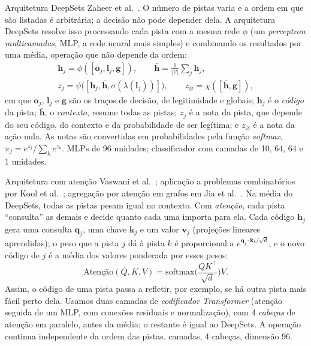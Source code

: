 \begin{metodo}{Arquitetura DeepSets}
\orig Zaheer et al.~\cite{zaheer2017}.
\func O número de pistas varia e a ordem em que são listadas é arbitrária; a decisão não pode depender dela. A
arquitetura DeepSets resolve isso processando cada pista com a mesma rede $\phi$ (um \emph{perceptron multicamadas}, MLP,
a rede neural mais simples) e combinando os resultados por uma média, operação que não depende da ordem:
\begin{equation}
  \begin{gathered}
  \bm{h}_j=\phi([\bm{o}_j,\bm{l}_j,\bm{g}]),\qquad \bar{\bm{h}}=\tfrac{1}{|\mathcal{V}|}\textstyle\sum_{j}\bm{h}_j,\\
  z_j=\psi\big([\bm{h}_j,\bar{\bm{h}},\sigma(\lambda(\bm{l}_j))]\big),\qquad z_{\varnothing}=\chi([\bar{\bm{h}},\bm{g}]),
  \end{gathered}
\end{equation}
em que $\bm{o}_j$, $\bm{l}_j$ e $\bm{g}$ são os traços de decisão, de legitimidade e globais; $\bm{h}_j$ é o
\emph{código} da pista; $\bar{\bm{h}}$, o \emph{contexto}, resume todas as pistas; $z_j$ é a nota da pista, que depende do
seu código, do contexto e da probabilidade de ser legítima; e $z_\varnothing$ é a nota da ação nula. As notas são
convertidas em probabilidades pela função \emph{softmax}, $\pi_j=e^{z_j}/\sum_ke^{z_k}$.
\parm MLPs de 96 unidades; classificador com camadas de 10, 64, 64 e 1 unidades.
\end{metodo}

\begin{metodo}{Arquitetura com atenção}
\orig Vaswani et al.~\cite{vaswani2017}; aplicação a problemas combinatórios por Kool et al.~\cite{kool2019}; agregação por
atenção em grafos em Jia et al.~\cite{jia2026}.
\func Na média do DeepSets, todas as pistas pesam igual no contexto. Com \emph{atenção}, cada pista ``consulta'' as demais
e decide quanto cada uma importa para ela. Cada código $\bm{h}_j$ gera uma consulta $\bm{q}_j$, uma chave $\bm{k}_j$ e um
valor $\bm{v}_j$ (projeções lineares aprendidas); o peso que a pista $j$ dá à pista $k$ é proporcional a
$e^{\bm{q}_j\cdot\bm{k}_k/\sqrt{d}}$, e o novo código de $j$ é a média dos valores ponderada por esses pesos:
\begin{equation}
  \text{Atenção}(Q,K,V)=\mathrm{softmax}\!\Big(\frac{QK^\top}{\sqrt{d}}\Big)V .
\end{equation}
Assim, o código de uma pista passa a refletir, por exemplo, se há outra pista mais fácil perto dela. Usamos duas camadas
de \emph{codificador Transformer} (atenção seguida de um MLP, com conexões residuais e normalização), com 4
\emph{cabeças} de atenção em paralelo, antes da média; o restante é igual ao DeepSets. A operação continua independente da
ordem das pistas.
 camadas, 4 cabeças, dimensão 96.
\end{metodo}

